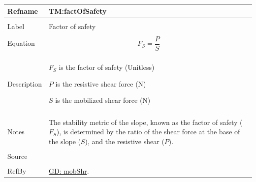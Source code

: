 \documentclass[12pt]{article}
\begin{document}
\noindent \begin{minipage}{\textwidth}
\begin{tabular}{p{} p{}}
\toprule \textbf{Refname} & \textbf{TM:factOfSafety}
\label{TM:factOfSafety}
\\ \midrule \\
Label & Factor of safety
        \\ \midrule \\
        Equation & \begin{displaymath}
                   {F_{S}}=\frac{P}{S}
                   \end{displaymath}
                   \\ \midrule \\
                   Description & \begin{symbDescription}
                                 \item{${F_{S}}$ is the factor of safety (Unitless)}
                                 \item{$P$ is the resistive shear force (N)}
                                 \item{$S$ is the mobilized shear force (N)}
                                 \end{symbDescription}
                                 \\ \midrule \\
                                 Notes & The stability metric of the slope, known as the factor of safety (${F_{S}}$), is determined by the ratio of the shear force at the base of the slope ($S$), and the resistive shear ($P$).
                                         \\ \midrule \\
                                         Source & \cite{fredlund1977}
                                                  \\ \midrule \\
                                                  RefBy & \hyperref[GD:mobShr]{GD: mobShr}.
\\ \bottomrule \end{tabular}
\end{minipage}
\par~
\end{document}
